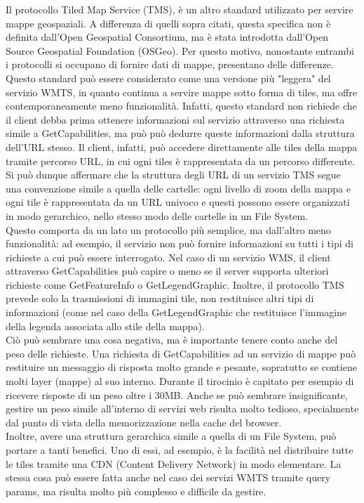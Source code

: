 Il protocollo Tiled Map Service (TMS), è un altro standard utilizzato per servire mappe geospaziali. A differenza di quelli sopra citati, questa specifica non è definita dall'Open Geospatial Consortium, ma è stata introdotta dall'Open Source Geospatial Foundation (OSGeo). Per questo motivo, nonostante entrambi i protocolli si occupano di fornire dati di mappe, presentano delle differenze.
\\Questo standard può essere considerato come una versione più "leggera" del servizio WMTS, in quanto continua a servire mappe sotto forma di tiles, ma offre contemporaneamente meno funzionalità.
Infatti, questo standard non richiede che il client debba prima ottenere informazioni sul servizio attraverso una richiesta simile a GetCapabilities, ma può può dedurre queste informazioni dalla struttura dell'URL stesso. Il client, infatti, può accedere direttamente alle tiles della mappa tramite percorso URL, in cui ogni tiles è rappresentata da un percorso differente.
Si può dunque affermare che la struttura degli URL di un servizio TMS segue una convenzione simile a quella delle cartelle: ogni livello di zoom della mappa e ogni tile è rappresentata da un URL univoco e questi possono essere organizzati in modo gerarchico, nello stesso modo delle cartelle in un File System.
\\Questo comporta da un lato un protocollo più semplice, ma dall'altro meno funzionalità: ad esempio, il servizio non può fornire informazioni su tutti i tipi di richieste a cui può essere interrogato. Nel caso di un servizio WMS, il client attraverso GetCapabilities può capire o meno se il server supporta ulteriori richieste come GetFeatureInfo o GetLegendGraphic.
Inoltre, il protocollo TMS prevede solo la trasmissioni di immagini tile, non restituisce altri tipi di informazioni (come nel caso della GetLegendGraphic che restituisce l'immagine della legenda associata allo stile della mappa).
\\Ciò può sembrare una cosa negativa, ma è importante tenere conto anche del peso delle richieste. Una richiesta di GetCapabilities ad un servizio di mappe può restituire un messaggio di risposta molto grande e pesante, sopratutto se contiene molti layer (mappe) al suo interno. Durante il tirocinio è capitato per esempio di ricevere risposte di un peso oltre i 30MB. Anche se può sembrare insignificante, gestire un peso simile all'interno di servizi web risulta molto tedioso, specialmente dal punto di vista della memorizzazione nella cache del browser.
\\Inoltre, avere una struttura gerarchica simile a quella di un File System, può portare a tanti benefici. Uno di essi, ad esempio, è la facilità nel distribuire tutte le tiles tramite una CDN (Content Delivery Network) in modo elementare. La stessa cosa può essere fatta anche nel caso dei servizi WMTS tramite query params, ma risulta molto più complesso e difficile da gestire.
